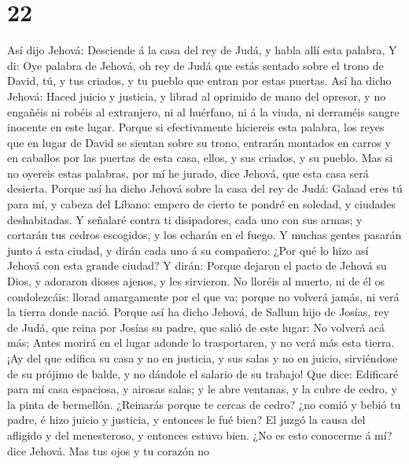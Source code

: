\hypertarget{section-21}{%
\section{22}\label{section-21}}

 Así dijo Jehová: Desciende á la casa del rey de Judá, y
habla allí esta palabra,  Y di: Oye palabra de Jehová, oh
rey de Judá que estás sentado sobre el trono de David, tú, y tus
criados, y tu pueblo que entran por estas puertas.  Así ha
dicho Jehová: Haced juicio y justicia, y librad al oprimido de mano del
opresor, y no engañéis ni robéis al extranjero, ni al huérfano, ni á la
viuda, ni derraméis sangre inocente en este lugar.  Porque
si efectivamente hiciereis esta palabra, los reyes que en lugar de David
se sientan sobre su trono, entrarán montados en carros y en caballos por
las puertas de esta casa, ellos, y sus criados, y su pueblo.
 Mas si no oyereis estas palabras, por mí he jurado, dice
Jehová, que esta casa será desierta.  Porque así ha dicho
Jehová sobre la casa del rey de Judá: Galaad eres tú para mí, y cabeza
del Líbano: empero de cierto te pondré en soledad, y ciudades
deshabitadas.  Y señalaré contra ti disipadores, cada uno
con sus armas; y cortarán tus cedros escogidos, y los echarán en el
fuego.  Y muchas gentes pasarán junto á esta ciudad, y dirán
cada uno á su compañero: ¿Por qué lo hizo así Jehová con esta grande
ciudad?  Y dirán: Porque dejaron el pacto de Jehová su Dios,
y adoraron dioses ajenos, y les sirvieron.  No lloréis al
muerto, ni de él os condolezcáis: llorad amargamente por el que va;
porque no volverá jamás, ni verá la tierra donde nació. 
Porque así ha dicho Jehová, de Sallum hijo de Josías, rey de Judá, que
reina por Josías su padre, que salió de este lugar: No volverá acá más;
 Antes morirá en el lugar adonde lo trasportaren, y no verá
más esta tierra.  ¡Ay del que edifica su casa y no en
justicia, y sus salas y no en juicio, sirviéndose de su prójimo de
balde, y no dándole el salario de su trabajo!  Que dice:
Edificaré para mí casa espaciosa, y airosas salas; y le abre ventanas, y
la cubre de cedro, y la pinta de bermellón.  ¿Reinarás
porque te cercas de cedro? ¿no comió y bebió tu padre, é hizo juicio y
justicia, y entonces le fué bien?  El juzgó la causa del
afligido y del menesteroso, y entonces estuvo bien. ¿No es esto
conocerme á mí? dice Jehová.  Mas tus ojos y tu corazón no
